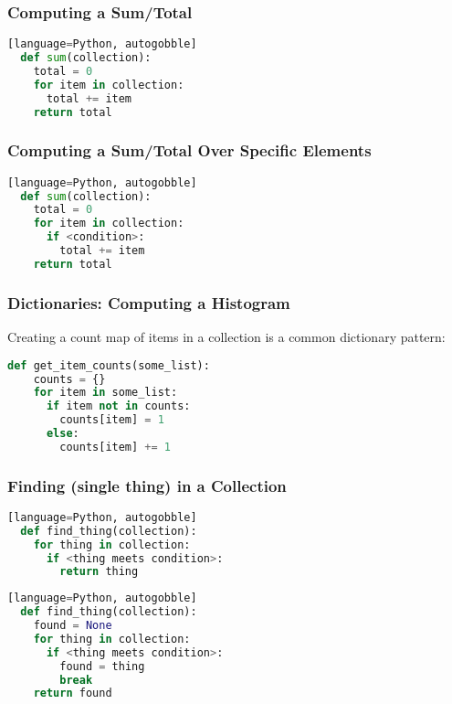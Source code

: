 \documentclass{beamer}
\begin{document}
%
%
\begin{frame}[fragile]
  \frametitle{Computing a Sum/Total}
  \begin{lstlisting}[language=Python, autogobble][language=Python, autogobble]
  def sum(collection):
    total = 0
    for item in collection:
      total += item
    return total
  \end{lstlisting}
\end{frame}


%
%
\begin{frame}[fragile]
  \frametitle{Computing a Sum/Total Over Specific Elements}
  \begin{lstlisting}[language=Python, autogobble][language=Python, autogobble]
  def sum(collection):
    total = 0
    for item in collection:
      if <condition>:
        total += item
    return total
  \end{lstlisting}
\end{frame}

%
%
\begin{frame}[fragile]
  \frametitle{Dictionaries: Computing a Histogram}
  Creating a count map of items in a collection is a common dictionary pattern:
  \begin{lstlisting}[language=Python, autogobble]
  def get_item_counts(some_list):
    counts = {}
    for item in some_list:
      if item not in counts:
        counts[item] = 1
      else:
        counts[item] += 1
  \end{lstlisting}
\end{frame}

%
%
\begin{frame}[fragile]
  \frametitle{Finding (single thing) in a Collection}
  \begin{lstlisting}[language=Python, autogobble][language=Python, autogobble]
  def find_thing(collection):
    for thing in collection:
      if <thing meets condition>:
        return thing
  \end{lstlisting}
  \vfill
  \begin{lstlisting}[language=Python, autogobble][language=Python, autogobble]
  def find_thing(collection):
    found = None
    for thing in collection:
      if <thing meets condition>:
        found = thing
        break
    return found
  \end{lstlisting}
\end{frame}
\end{document}
